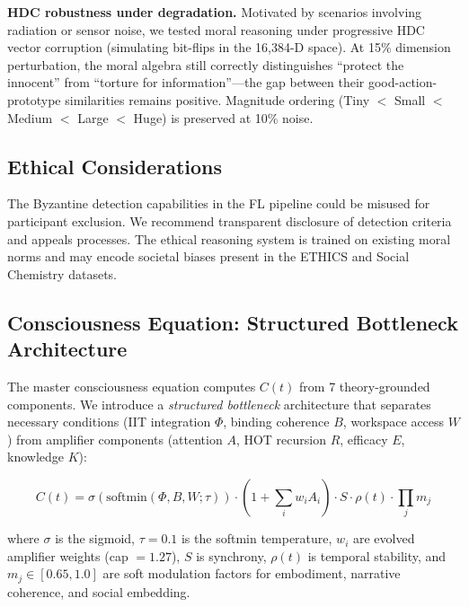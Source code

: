 \documentclass[10pt,letterpaper]{article}
\renewcommand{\Phi}{\varPhi}
\begin{document}
\textbf{HDC robustness under degradation.} Motivated by scenarios involving radiation or sensor noise, we tested moral reasoning under progressive HDC vector corruption (simulating bit-flips in the 16{,}384-D space). At 15\% dimension perturbation, the moral algebra still correctly distinguishes ``protect the innocent'' from ``torture for information''---the gap between their good-action-prototype similarities remains positive. Magnitude ordering (Tiny $<$ Small $<$ Medium $<$ Large $<$ Huge) is preserved at 10\% noise.

\subsection{Ethical Considerations}

The Byzantine detection capabilities in the FL pipeline could be misused for participant exclusion. We recommend transparent disclosure of detection criteria and appeals processes. The ethical reasoning system is trained on existing moral norms and may encode societal biases present in the ETHICS and Social Chemistry datasets.


\subsection{Consciousness Equation: Structured Bottleneck Architecture}

The master consciousness equation computes $C(t)$ from 7 theory-grounded components.
We introduce a \textit{structured bottleneck} architecture that separates necessary
conditions (IIT integration $\Phi$, binding coherence $B$, workspace access $W$)
from amplifier components (attention $A$, HOT recursion $R$, efficacy $E$, knowledge $K$):

\begin{equation}
C(t) = \sigma\!\left(\text{softmin}(\Phi, B, W; \tau)\right) \cdot \left(1 + \sum_i w_i A_i\right) \cdot S \cdot \rho(t) \cdot \prod_j m_j
\end{equation}

\noindent where $\sigma$ is the sigmoid, $\tau{=}0.1$ is the softmin temperature,
$w_i$ are evolved amplifier weights (cap $= 1.27$), $S$ is synchrony, $\rho(t)$
is temporal stability, and $m_j \in [0.65, 1.0]$ are soft modulation factors
for embodiment, narrative coherence, and social embedding.
\end{document}

